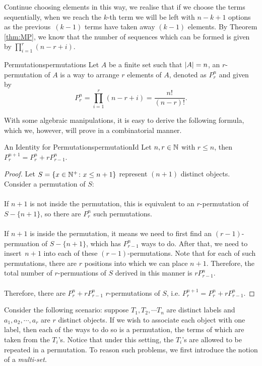 \documentclass[math]{amznotes}
\theoremstyle{remark}
\begin{document}
Continue choosing elements in this way, we realise that if we choose the terms sequentially, when we reach the $k$-th term we will be left with $n - k + 1$ options as the previous~$(k - 1)$ terms have taken away $(k - 1)$ elements. By Theorem \ref{thm:MP}, we know that the number of sequences which can be formed is given by $\prod_{i = 1}^{r}(n - r + i)$.
\begin{dfnbox}{Permutations}{permutations}
    Let $A$ be a finite set such that ${\left\lvert {A} \right\rvert} = n$, an $r$-permutation of $A$ is a way to arrange $r$ elements of $A$, denoted as $P^n_r$ and given by
    \begin{equation*}
        P^n_r = \prod_{i = 1}^{r}(n - r + i) = \frac{n!}{(n - r)!}.
    \end{equation*}
\end{dfnbox}
With some algebraic manipulations, it is easy to derive the following formula, which we, however, will prove in a combinatorial manner.
\begin{probox}{An Identity for Permutations}{permutationId}
    Let $n, r \in \mathbb{N}$ with $r \leq n$, then $P^{n + 1}_r = P^n_r + rP^n_{r - 1}$.
    \tcblower
    \begin{proof}
        Let $S = \left\{x \in \mathbb{N}^+ \colon x \leq n + 1\right\}$ represent $(n + 1)$ distinct objects. Consider a permutation of $S$:
        \\\\
        If $n + 1$ is not inside the permutation, this is equivalent to an $r$-permutation of~$S - \{n + 1\}$, so there are $P^n_r$ such permutations.
        \\\\
    If $n + 1$ is inside the permutation, it means we need to first find an $(r - 1)$-permuation of $S - \{n + 1\}$, which has $P^n_{r - 1}$ ways to do. After that, we need to insert~$n + 1$ into each of these $(r - 1)$-permutations. Note that for each of such permutations, there are $r$ positions into which we can place $n + 1$. Therefore, the total number of $r$-permuations of $S$ derived in this manner is $rP^n_{r - 1}$.
        \\\\
        Therefore, there are $P^n_{r} + rP^n_{r - 1}$ $r$-permutations of $S$, i.e. $P^{n + 1}_r = P^n_r + rP^n_{r - 1}$. 
    \end{proof}
\end{probox}
Consider the following scenario: suppose $T_1, T_2, \cdots T_n$ are distinct labels and $a_1, a_2, \cdots, a_r$ are $r$ distinct objects. If we wish to associate each object with one label, then each of the ways to do so is a permutation, the terms of which are taken from the $T_i$'s. Notice that under this setting, the $T_i$'s are allowed to be repeated in a permutation. To reason such problems, we first introduce the notion of a \textit{multi-set}.
\end{document}
